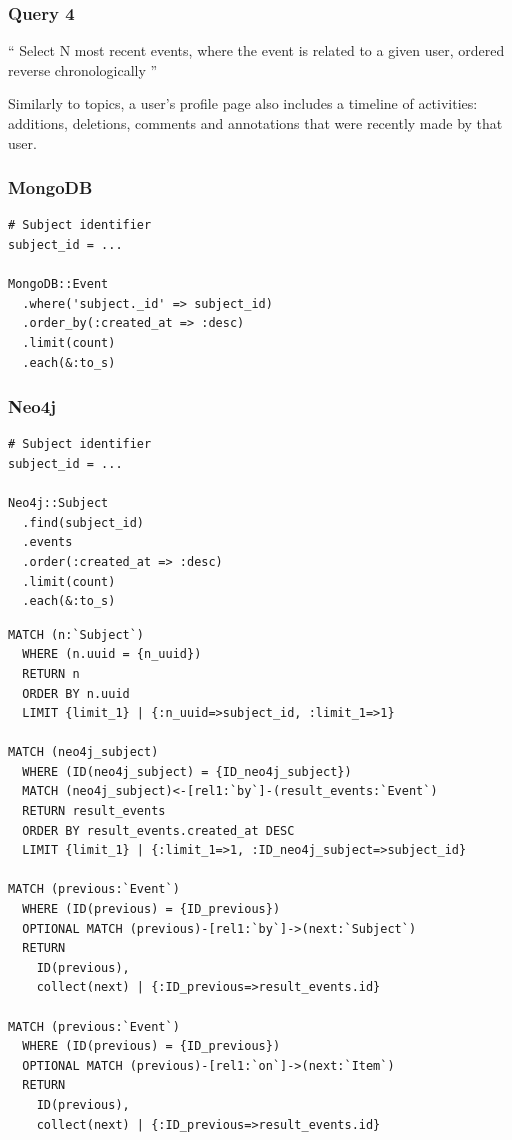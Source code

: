 \subsubsection{Query 4}
\label{subsubsec:query-4}

``
Select N most recent events, where the event is related to a given user, ordered reverse chronologically
''

Similarly to topics, a user's profile page also includes a timeline of  activities: additions, deletions, comments and annotations that were recently made by that user.

\subsubsection*{MongoDB}

\begin{verbatim}
# Subject identifier
subject_id = ...

MongoDB::Event
  .where('subject._id' => subject_id)
  .order_by(:created_at => :desc)
  .limit(count)
  .each(&:to_s)
\end{verbatim}

\subsubsection*{Neo4j}

\begin{verbatim}
# Subject identifier
subject_id = ...

Neo4j::Subject
  .find(subject_id)
  .events
  .order(:created_at => :desc)
  .limit(count)
  .each(&:to_s)
\end{verbatim}

\begin{verbatim}
MATCH (n:`Subject`)
  WHERE (n.uuid = {n_uuid})
  RETURN n
  ORDER BY n.uuid
  LIMIT {limit_1} | {:n_uuid=>subject_id, :limit_1=>1}

MATCH (neo4j_subject)
  WHERE (ID(neo4j_subject) = {ID_neo4j_subject})
  MATCH (neo4j_subject)<-[rel1:`by`]-(result_events:`Event`)
  RETURN result_events
  ORDER BY result_events.created_at DESC
  LIMIT {limit_1} | {:limit_1=>1, :ID_neo4j_subject=>subject_id}

MATCH (previous:`Event`)
  WHERE (ID(previous) = {ID_previous})
  OPTIONAL MATCH (previous)-[rel1:`by`]->(next:`Subject`)
  RETURN
    ID(previous),
    collect(next) | {:ID_previous=>result_events.id}

MATCH (previous:`Event`)
  WHERE (ID(previous) = {ID_previous})
  OPTIONAL MATCH (previous)-[rel1:`on`]->(next:`Item`)
  RETURN
    ID(previous),
    collect(next) | {:ID_previous=>result_events.id}
\end{verbatim}

